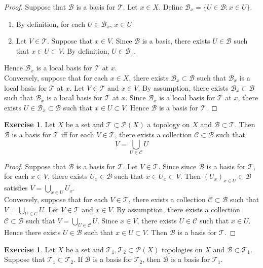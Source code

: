 \documentclass[12pt]{amsart}
\theoremstyle{definition}
\newtheorem{ex}[definition]{Exercise}
\newcommand{\MC}{\mathcal{C}}
\newcommand{\MB}{\mathcal{B}}
\newcommand{\MP}{\mathcal{P}}
\newcommand{\MT}{\mathcal{T}}
\DeclareMathOperator*{\0}{\mbf{0}}
\DeclareMathOperator*{\1}{\mbf{1}}
\newcommand{\lex}[1]{\label{ex:#1}}
\begin{document}
	\begin{proof}
		Suppose that $\MB$ is a basis for $\MT$. Let $x \in X$. Define $\MB_x = \{U \in \MB: x \in U\}$. 
		\begin{enumerate}
			\item By definition, for each $U \in \MB_x$, $x \in U$
			\item Let $V \in \MT$. Suppose that $x \in V$. Since $\MB$ is a basis, there exists $U \in \MB$ such that $x \in U \subset V$. By definition, $U \in \MB_x$.
		\end{enumerate}
		Hence $\MB_x$ is a local basis for $\MT$ at $x$. \\
		Conversely, suppose that for each $x \in X$, there exists $\MB_x \subset \MB$ such that $\MB_x$ is a local basis for $\MT$ at $x$. Let $V \in \MT$ and $x \in V$. By assumption, there exists $\MB_x \subset \MB$ such that $\MB_x$ is a local basis for $\MT$ at $x$. Since $\MB_x$ is a local basis for $\MT$ at $x$, there exists $U \in \MB_x \subset \MB$ such that $x \in U \subset V$. Hence $\MB$ is a basis for $\MT$. 
	\end{proof}
	
	\begin{ex} \lex{31008}
	Let $X$ be a set and $\MT \subset \MP(X)$ a topology on $X$ and $\MB \subset \MT$. Then $\MB$ is a basis for $\MT$ iff for each $V \in \MT$, there exists a collection $\MC \subset \MB$ such that $$V = \bigcup\limits_{U \in \MC} U$$
	\end{ex}
	
	\begin{proof}
	Suppose that $\MB$ is a basis for $\MT$. Let $V \in \MT$. Since since $\MB$ is a basis for $\MT$, for each $x \in V$, there exists $U_x \in \MB$ such that $x \in U_x \subset V$. Then $(U_x)_{x \in U} \subset \MB$ satisfies $V = \bigcup\limits_{x \in U} U_x$. \\
	Conversely, suppose that for each $V \in \MT$, there exists a collection $\MC \subset \MB$ such that $V = \bigcup\limits_{U \in \MC} U$. Let $V \in \MT$ and $x \in V$. By assumption, there exists a collection $\MC \subset \MB$ such that $V = \bigcup\limits_{U \in \MC} U$. Since $x \in V$, there exists $U \in \MC$ such that $x \in U$. Hence there exists $U \in \MB$ such that $x \in U \subset V$. Then $\MB$ is a basis for $\MT$.
	\end{proof}
	
	\begin{ex} \lex{31008.1}
	Let $X$ be a set and $\MT_1, \MT_2 \subset \MP(X)$ topologies on $X$ and $\MB \subset \MT_1$. Suppose that $\MT_1 \subset \MT_2$. If $\MB$ is a basis for $\MT_2$, then $\MB$ is a basis for $\MT_1$.  
	\end{ex}
	
\end{document}
